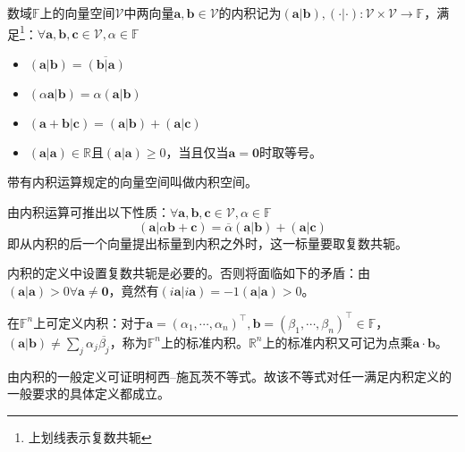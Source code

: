 \documentclass[main.tex]{subfiles}
\begin{document}
\begin{definition}[内积]
数域$\mathbb{F}$上的向量空间$\mathcal{V}$中两向量$\mathbf{a},\mathbf{b}\in\mathcal{V}$的内积记为$\left(\mathbf{a}|\mathbf{b}\right),\left(\cdot|\cdot\right):\mathcal{V}\times\mathcal{V}\rightarrow\mathbb{F}$，满足\footnote{上划线表示复数共轭}：$\forall\mathbf{a},\mathbf{b},\mathbf{c}\in\mathcal{V},\alpha\in\mathbb{F}$
\begin{itemize}
    \item $\left(\mathbf{a}|\mathbf{b}\right)=\overline{\left(\mathbf{b}|\mathbf{a}\right)}$
    \item $\left(\alpha\mathbf{a}|\mathbf{b}\right)=\alpha\left(\mathbf{a}|\mathbf{b}\right)$
    \item $\left(\mathbf{a}+\mathbf{b}|\mathbf{c}\right)=\left(\mathbf{a}|\mathbf{b}\right)+\left(\mathbf{a}|\mathbf{c}\right)$
    \item $\left(\mathbf{a}|\mathbf{a}\right)\in\mathbb{R}$且$\left(\mathbf{a}|\mathbf{a}\right)\geq0$，当且仅当$\mathbf{a}=\mathbf{0}$时取等号。
\end{itemize}
\end{definition}

\begin{definition}[内积空间]
带有内积运算规定的向量空间叫做内积空间。
\end{definition}

由内积运算可推出以下性质：$\forall\mathbf{a},\mathbf{b},\mathbf{c}\in\mathcal{V},\alpha\in\mathbb{F}$
\[\left(\mathbf{a}|\alpha\mathbf{b}+\mathbf{c}\right)=\overline{\alpha}\left(\mathbf{a}|\mathbf{b}\right)+\left(\mathbf{a}|\mathbf{c}\right)\]
即从内积的后一个向量提出标量到内积之外时，这一标量要取复数共轭。

内积的定义中设置复数共轭是必要的。否则将面临如下的矛盾：由$\left(\mathbf{a}|\mathbf{a}\right)>0\forall\mathbf{a}\neq\mathbf{0}$，竟然有$\left(i\mathbf{a}|i\mathbf{a}\right)=-1\left(\mathbf{a}|\mathbf{a}\right)>0$。

\begin{example}
在$\mathbb{F}^n$上可定义内积：对于$\mathbf{a}=\left(\alpha_1,\cdots,\alpha_n\right)^\intercal,\mathbf{b}=\left(\beta_1,\cdots,\beta_n\right)^\intercal\in\mathbb{F}$，$\left(\mathbf{a}|\mathbf{b}\right)\neq\sum_j\alpha_j\overline{\beta_j}$，称为$\mathbb{F}^n$上的标准内积。$\mathbb{R}^n$上的标准内积又可记为点乘$\mathbf{a}\cdot\mathbf{b}$。
\end{example}

由内积的一般定义可证明柯西--施瓦茨不等式。故该不等式对任一满足内积定义的一般要求的具体定义都成立。
\end{document}
